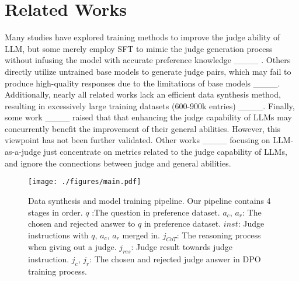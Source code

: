 \section{Related Works}
Many studies have explored training methods to improve the judge ability of LLM, but some merely employ SFT to mimic the judge generation process without infusing the model with accurate preference knowledge ____ . Others directly utilize untrained base models to generate judge pairs, which may fail to produce high-quality responses due to the limitations of base models ____. Additionally, nearly all related works lack an efficient data synthesis method, resulting in excessively large training datasets (600-900k entries) ____. Finally, some work ____ raised that that enhancing the judge capability of LLMs may concurrently benefit the improvement of their general abilities. However, this viewpoint has not been further validated. Other works ____ focusing on LLM-as-a-judge just concentrate on metrics related to the judge capability of LLMs, and ignore the connections between judge and general abilities.

\begin{figure*}[t]
  \texttt{[image: ./figures/main.pdf]}
  \caption {Data synthesis and model training pipeline. Our pipeline contains 4 stages in order. $q$ :The question in preference dataset. $a_c$, $a_r$: The chosen and rejected answer to $q$ in preference dataset. $inst$: Judge instructions with $q$, $a_c$, $a_r$ merged in. $j_{CoT}$: The reasoning process when giving out a judge. $j_{res}$: Judge result towards judge instruction. $j_c$, $j_r$: The chosen and rejected judge answer in DPO training process.}
    \label{fig:main}
\end{figure*}